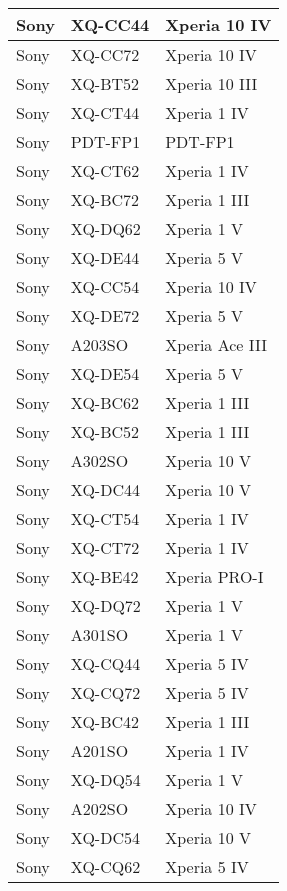 \begin{tabularx}{\linewidth}{|l|X|X|}
        Sony & XQ-CC44 & Xperia 10 IV \\ \hline
        Sony & XQ-CC72 & Xperia 10 IV \\ \hline
        Sony & XQ-BT52 & Xperia 10 III \\ \hline
        Sony & XQ-CT44 & Xperia 1 IV \\ \hline
        Sony & PDT-FP1 & PDT-FP1 \\ \hline
        Sony & XQ-CT62 & Xperia 1 IV \\ \hline
        Sony & XQ-BC72 & Xperia 1 III \\ \hline
        Sony & XQ-DQ62 & Xperia 1 V \\ \hline
        Sony & XQ-DE44 & Xperia 5 V \\ \hline
        Sony & XQ-CC54 & Xperia 10 IV \\ \hline
        Sony & XQ-DE72 & Xperia 5 V \\ \hline
        Sony & A203SO & Xperia Ace III \\ \hline
        Sony & XQ-DE54 & Xperia 5 V \\ \hline
        Sony & XQ-BC62 & Xperia 1 III \\ \hline
        Sony & XQ-BC52 & Xperia 1 III \\ \hline
        Sony & A302SO & Xperia 10 V \\ \hline
        Sony & XQ-DC44 & Xperia 10 V \\ \hline
        Sony & XQ-CT54 & Xperia 1 IV \\ \hline
        Sony & XQ-CT72 & Xperia 1 IV \\ \hline
        Sony & XQ-BE42 & Xperia PRO-I \\ \hline
        Sony & XQ-DQ72 & Xperia 1 V \\ \hline
        Sony & A301SO & Xperia 1 V \\ \hline
        Sony & XQ-CQ44 & Xperia 5 IV \\ \hline
        Sony & XQ-CQ72 & Xperia 5 IV \\ \hline
        Sony & XQ-BC42 & Xperia 1 III \\ \hline
        Sony & A201SO & Xperia 1 IV \\ \hline
        Sony & XQ-DQ54 & Xperia 1 V \\ \hline
        Sony & A202SO & Xperia 10 IV \\ \hline
        Sony & XQ-DC54 & Xperia 10 V \\ \hline
        Sony & XQ-CQ62 & Xperia 5 IV \\ \hline

\end{tabularx}
